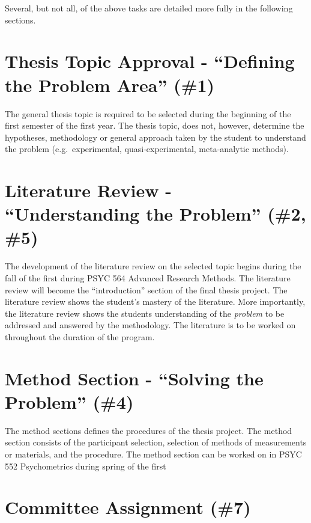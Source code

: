 \documentclass[]{book}
\begin{document}
Several, but not all, of the above tasks are detailed more fully in the following sections.

\hypertarget{thesis-topic-approval---defining-the-problem-area-1}{%
\section{Thesis Topic Approval - ``Defining the Problem Area'' (\#1)}\label{thesis-topic-approval---defining-the-problem-area-1}}

The general thesis topic is required to be selected during the beginning of the first semester of the first year. The thesis topic, does not, however, determine the hypotheses, methodology or general approach taken by the student to understand the problem (e.g.~experimental, quasi-experimental, meta-analytic methods).

\hypertarget{literature-review---understanding-the-problem-2-5}{%
\section{Literature Review - ``Understanding the Problem'' (\#2, \#5)}\label{literature-review---understanding-the-problem-2-5}}

The development of the literature review on the selected topic begins during the fall of the first during PSYC 564 Advanced Research Methods. The literature review will become the ``introduction'' section of the final thesis project. The literature review shows the student's mastery of the literature. More importantly, the literature review shows the students understanding of the \emph{problem} to be addressed and answered by the methodology. The literature is to be worked on throughout the duration of the program.

\hypertarget{method-section---solving-the-problem-4}{%
\section{Method Section - ``Solving the Problem'' (\#4)}\label{method-section---solving-the-problem-4}}

The method sections defines the procedures of the thesis project. The method section consists of the participant selection, selection of methods of measurements or materials, and the procedure. The method section can be worked on in PSYC 552 Psychometrics during spring of the first

\hypertarget{committee-assignment-7}{%
\section{Committee Assignment (\#7)}\label{committee-assignment-7}}
\end{document}
